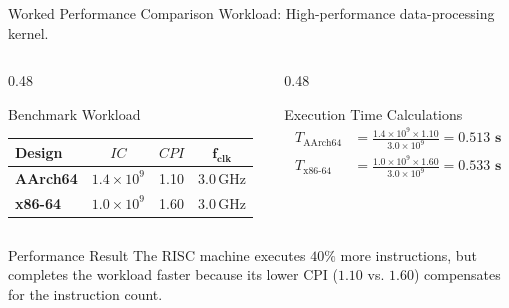 \documentclass[aspectratio=169,11pt,t]{beamer}
\begin{document}
\begin{frame}{Worked Performance Comparison}
Workload: High-performance data-processing kernel.

\vspace{0.1cm}
\begin{columns}[T,onlytextwidth]
\begin{column}{0.48\textwidth}
\begin{block}{Benchmark Workload}
\centering
\vspace{0.1em}
\setlength{\tabcolsep}{4pt}
\small
\begin{tabular}{lccc}
\toprule
\textbf{Design} & $\mathbf{\mathit{IC}}$ & $\mathbf{\mathit{CPI}}$ & $\mathbf{f_{\text{clk}}}$ \\
\midrule
\textbf{AArch64} & $1.4\times 10^9$ & 1.10 & 3.0\,GHz \\
\textbf{x86-64}  & $1.0\times 10^9$ & 1.60 & 3.0\,GHz \\
\bottomrule
\end{tabular}
\end{block}
\end{column}

\begin{column}{0.48\textwidth}
\begin{block}{Execution Time Calculations}
\vspace{-0.2em}
\begin{align*}
T_{\text{AArch64}} &= \frac{1.4\times 10^9 \times 1.10}{3.0 \times 10^9} = \mathbf{0.513\text{ s}} \\[0.2em]
T_{\text{x86-64}}  &= \frac{1.0\times 10^9 \times 1.60}{3.0 \times 10^9} = \mathbf{0.533\text{ s}}
\end{align*}
\end{block}
\end{column}
\end{columns}

\vspace{0.3cm}
\normalsize
\begin{block}{Performance Result}
The RISC machine executes $40\%$ more instructions, but completes the workload faster because its lower CPI ($1.10$ vs. $1.60$) compensates for the instruction count.
\end{block}
\end{frame}

\end{document}
